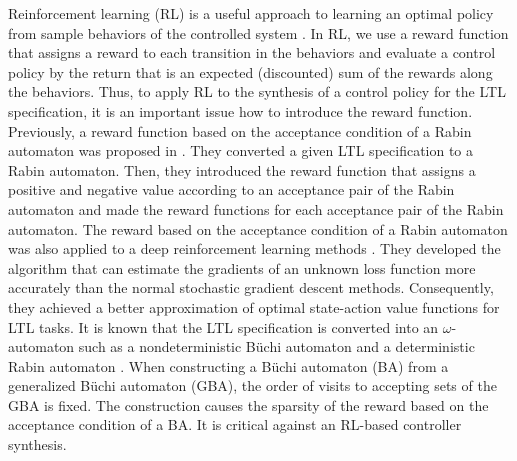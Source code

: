 \documentclass[letterpaper, 10 pt, conference]{ieeeconf}  %
\begin{document}
Reinforcement learning (RL) is a useful approach to learning an optimal policy from sample behaviors of the controlled system \cite{Sutton}.
In RL, we use a reward function that assigns a reward to each transition in the behaviors and evaluate a control policy by the return that is an expected (discounted) sum of the rewards along the behaviors.
Thus, to apply RL to the synthesis of a control policy for the LTL specification, it is an important issue how to introduce the reward function.
Previously, a reward function based on the acceptance condition of a Rabin automaton was proposed in \cite{Sadigh2014}. They converted a given LTL specification to a Rabin automaton. Then, they introduced the reward function that assigns a positive and negative value according to an acceptance pair of the Rabin automaton and made the reward functions for each acceptance pair of the Rabin automaton. The reward based on the acceptance condition of a Rabin automaton was also applied to a deep reinforcement learning methods \cite{QDYYM2019}. They developed the algorithm that can estimate the gradients of an unknown loss function more accurately than the normal stochastic gradient descent methods. Consequently, they achieved a better approximation of optimal state-action value functions for LTL tasks.
It is known that the LTL specification is converted into an $\omega$-automaton such as a nondeterministic B\"{u}chi automaton and a deterministic Rabin automaton \cite{BK2008,Belta2017}.
 When constructing a B\"{u}chi automaton (BA) from a generalized B\"{u}chi automaton (GBA), the order of visits to accepting sets of the GBA is fixed. The construction causes the sparsity of the reward based on the acceptance condition of a BA. It is critical against an RL-based controller synthesis.
\end{document}
